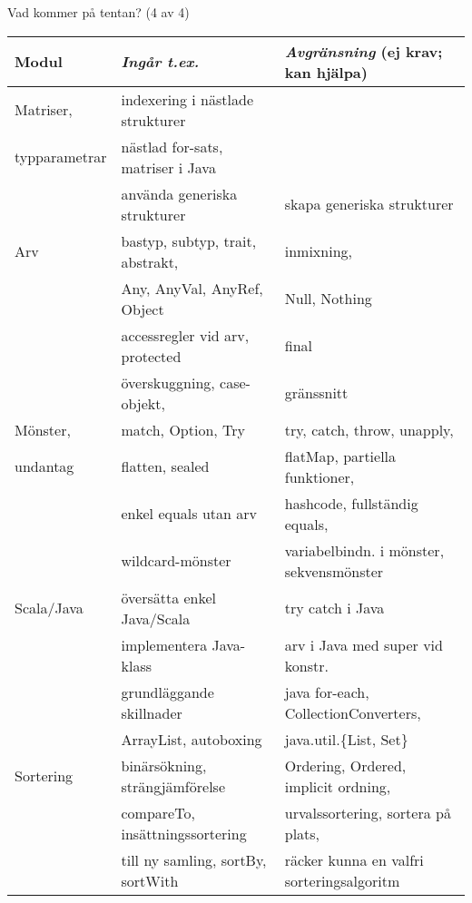 \begin{Slide}{Vad kommer på tentan? (4 av 4)}\SlideFontTiny
\hspace{-2em}\begin{minipage}{1.0\textwidth}
\begin{tabular}{l | l | l}
\textbf{Modul} & \textit{Ingår t.ex.}& \textit{Avgränsning} (ej krav; kan hjälpa)\\\hline

Matriser,     & indexering i nästlade strukturer & \\
typparametrar & nästlad for-sats, matriser i Java  & \\
              & använda generiska strukturer & skapa generiska strukturer\\
\hline

Arv         &  bastyp, subtyp, trait, abstrakt,   & inmixning, \\
            &  Any, AnyVal, AnyRef, Object     & Null, Nothing\\
            &  accessregler vid arv, protected & final\\
            &  överskuggning, case-objekt,     & gränssnitt\\
\hline

Mönster,     & match, Option, Try       & try, catch, throw, unapply,\\
undantag     & flatten, sealed          & flatMap, partiella funktioner,\\
             & enkel equals utan arv    & hashcode, fullständig equals,   \\
             & wildcard-mönster         & variabelbindn. i mönster, sekvensmönster\\
\hline


Scala/Java & översätta enkel Java/Scala & try catch i Java \\
           & implementera Java-klass  &  arv i Java med super vid konstr.\\
           & grundläggande skillnader & java for-each, CollectionConverters,\\
           & ArrayList, autoboxing & java.util.\{List, Set\}\\
\hline

Sortering & binärsökning, strängjämförelse & Ordering, Ordered, implicit ordning, \\
             & compareTo, insättningssortering & urvalssortering, sortera på plats,\\
             & till ny samling, sortBy, sortWith & räcker kunna en valfri sorteringsalgoritm \\
\hline

\end{tabular}
\end{minipage}
\end{Slide}



